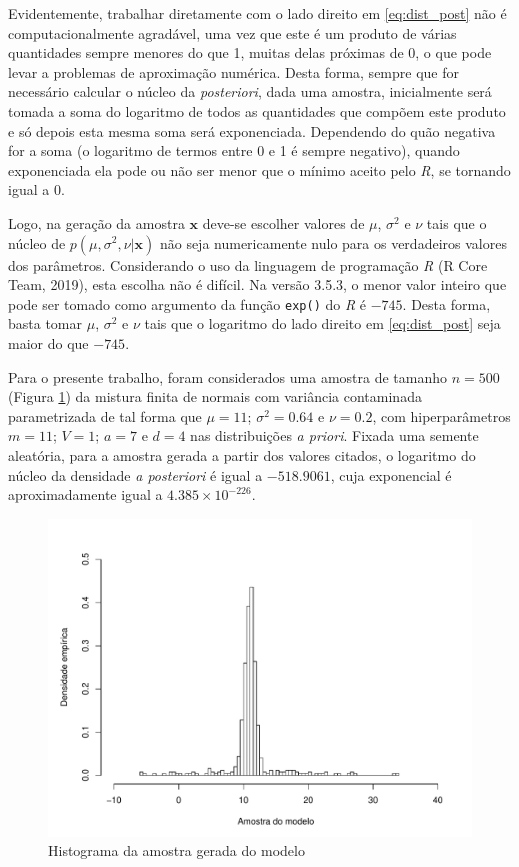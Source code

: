 Evidentemente, trabalhar diretamente com o lado direito em \eqref{eq:dist_post} não é computacionalmente agradável, uma vez que este é um produto de várias quantidades sempre menores do que 1, muitas delas próximas de 0, o que pode levar a problemas de aproximação numérica. Desta forma, sempre que for necessário calcular o núcleo da \textit{posteriori}, dada uma amostra, inicialmente será tomada a soma do logaritmo de todos as quantidades que compõem este produto e só depois esta mesma soma será exponenciada. Dependendo do quão negativa for a soma (o logaritmo de termos entre 0 e 1 é sempre negativo), quando exponenciada ela pode ou não ser menor que o mínimo aceito pelo \textit{R}, se tornando igual a 0.

Logo, na geração da amostra $\bm{x}$ deve-se escolher valores de $\mu$, $\sigma^2$ e $\nu$ tais que o núcleo de $p(\mu, \sigma^2, \nu | \bm{x})$ não seja numericamente nulo para os verdadeiros valores dos parâmetros. Considerando o uso da linguagem de programação \textit{R} (R Core Team, 2019)\cite{RCoreTeam2019}, esta escolha não é difícil. Na versão 3.5.3, o menor valor inteiro que pode ser tomado como argumento da função \verb|exp()| do \textit{R} é $-745$. Desta forma, basta tomar $\mu$, $\sigma^2$ e $\nu$ tais que o logaritmo do lado direito em \eqref{eq:dist_post} seja maior do que $-745$.

Para o presente trabalho, foram considerados uma amostra de tamanho $n=500$ (Figura \ref{fig:sample_n}) da mistura finita de normais com variância contaminada parametrizada de tal forma que $\mu = 11$; $\sigma^2 = 0.64$ e $\nu = 0.2$, com hiperparâmetros $m = 11$; $V = 1$; $a = 7$ e $d = 4$ nas distribuições \textit{a priori}. Fixada uma semente aleatória, para a amostra gerada a partir dos valores citados, o logaritmo do núcleo da densidade \textit{a posteriori} é igual a $-518.9061$, cuja exponencial é aproximadamente igual a $4.385 \times 10^{-226}$.

\begin{figure}[htb]
	\centering
	\includegraphics[scale=0.8]{figuras/amostra_n.pdf}
	\caption{Histograma da amostra gerada do modelo}
	\label{fig:sample_n}
\end{figure}

